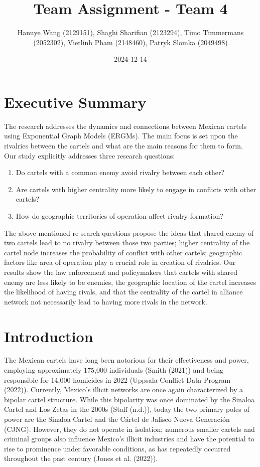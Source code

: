 \documentclass[
]{article}
\title{Team Assignment - Team 4}
\author{Hanuye Wang (2129151), Shaghi Sharifian (2123294), Timo
Timmermans (2052302), Vietlinh Pham (2148460), Patryk Slomka (2049498)}
\date{2024-12-14}
\providecommand{\tightlist}{%
  \setlength{\itemsep}{0pt}\setlength{\parskip}{0pt}}\usepackage{longtable,booktabs,array}
\renewcommand*\contentsname{Table of contents}
\newcommand\contentsname{Table of contents}
\begin{document}
\maketitle

\renewcommand*\contentsname{Table of contents}
{
\hypersetup{linkcolor=}
\setcounter{tocdepth}{3}
\tableofcontents
}

\section{Executive Summary}\label{executive-summary}

The research addresses the dynamics and connections between Mexican
cartels using Exponential Graph Models (ERGMs). The main focus is set
upon the rivalries between the cartels and what are the main reasons for
them to form. Our study explicitly addresses three research questions:

\begin{enumerate}
\def\labelenumi{\arabic{enumi}.}
\tightlist
\item
  Do cartels with a common enemy avoid rivalry between each other?
\item
  Are cartels with higher centrality more likely to engage in conflicts
  with other cartels?
\item
  How do geographic territories of operation affect rivalry formation?
\end{enumerate}

The above-mentioned re search questions propose the ideas that shared
enemy of two cartels lead to no rivalry between those two parties;
higher centrality of the cartel node increases the probability of
conflict with other cartels; geographic factors like area of operation
play a crucial role in creation of rivalries. Our results show the law
enforcement and policymakers that cartels with shared enemy are less
likely to be enemies, the geographic location of the cartel increases
the likelihood of having rivals, and that the centrality of the cartel
in alliance network not necessarily lead to having more rivals in the
network.

\section{Introduction}\label{introduction}

The Mexican cartels have long been notorious for their effectiveness and
power, employing approximately 175,000 individuals (Smith (2021)) and
being responsible for 14,000 homicides in 2022 (Uppsala Conflict Data
Program (2022)). Currently, Mexico's illicit networks are once again
characterized by a bipolar cartel structure. While this bipolarity was
once dominated by the Sinaloa Cartel and Los Zetas in the 2000s (Staff
(n.d.)), today the two primary poles of power are the Sinaloa Cartel and
the Cártel de Jalisco Nueva Generación (CJNG). However, they do not
operate in isolation; numerous smaller cartels and criminal groups also
influence Mexico's illicit industries and have the potential to rise to
prominence under favorable conditions, as has repeatedly occurred
throughout the past century (Jones et al. (2022)).
\end{document}
